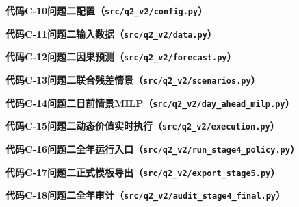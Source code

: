 \documentclass[zihao=-4,a4paper,UTF8,fontset=none]{ctexart}
\begin{document}
\begin{center}\textbf{代码C-10\quad 问题二配置（\texttt{src/q2\_v2/config.py}）}\end{center}

\begin{center}\textbf{代码C-11\quad 问题二输入数据（\texttt{src/q2\_v2/data.py}）}\end{center}

\begin{center}\textbf{代码C-12\quad 问题二因果预测（\texttt{src/q2\_v2/forecast.py}）}\end{center}

\begin{center}\textbf{代码C-13\quad 问题二联合残差情景（\texttt{src/q2\_v2/scenarios.py}）}\end{center}

\begin{center}\textbf{代码C-14\quad 问题二日前情景MILP（\texttt{src/q2\_v2/day\_ahead\_milp.py}）}\end{center}

\begin{center}\textbf{代码C-15\quad 问题二动态价值实时执行（\texttt{src/q2\_v2/execution.py}）}\end{center}

\begin{center}\textbf{代码C-16\quad 问题二全年运行入口（\texttt{src/q2\_v2/run\_stage4\_policy.py}）}\end{center}

\begin{center}\textbf{代码C-17\quad 问题二正式模板导出（\texttt{src/q2\_v2/export\_stage5.py}）}\end{center}

\begin{center}\textbf{代码C-18\quad 问题二全年审计（\texttt{src/q2\_v2/audit\_stage4\_final.py}）}\end{center}

\end{document}
